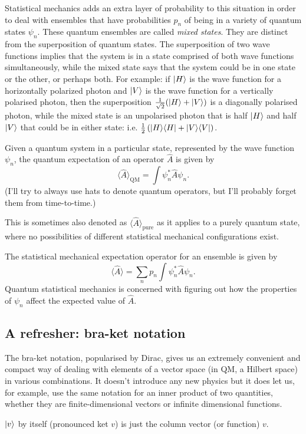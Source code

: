 \documentclass{article}
\begin{document}
Statistical mechanics adds an extra layer of probability to this situation in order to deal with ensembles that have probabilities $p_n$ of being in a variety of quantum states $\psi_n$. These quantum ensembles are called \emph{mixed states}. They are distinct from the superposition of quantum states. The superposition of two wave functions implies that the system is in a state comprised of both wave functions simultaneously, while the mixed state says that the system could be in one state or the other, or perhaps both. For example: if $| H \rangle$
is the wave function for a horizontally polarized photon and $| V \rangle$ is the wave function for a vertically polarised photon, then the superposition $\frac{1}{\sqrt{2}}(| H \rangle+| V \rangle)$ is a diagonally polarised photon, while the mixed state is an unpolarised photon that is half $| H \rangle$ and half $| V \rangle$ that could be in either state:  i.e. $\frac12\left(| H \rangle\langle H |+| V \rangle\langle V |\right)$.

Given a quantum system in a particular state, represented by the wave function $\psi_n$, the quantum expectation of an operator $\hat{A}$ is given by
$$
	\langle\hat{A}\rangle_\text{QM} = \int\psi^*_n\hat{A}\psi_n.
$$
(I'll try to always use hats to denote quantum operators, but I'll probably forget them from time-to-time.)

This is sometimes also denoted as $\langle\hat{A}\rangle_\text{pure}$ as it applies to a purely quantum state, where no possibilities of different statistical mechanical configurations exist.

The statistical mechanical expectation operator for an ensemble is given by
$$
		\langle\hat{A}\rangle = \sum_n p_n\int\psi_n^*\hat{A}\psi_n.
$$
Quantum statistical mechanics is concerned with figuring out how the properties of $\psi_n$ affect the expected value of $\hat{A}$.

\subsection*{A refresher: bra-ket notation}
The bra-ket notation, popularised by Dirac, gives us an extremely convenient and compact way of dealing with elements of a vector space (in QM, a Hilbert space) in various combinations. It doesn't introduce any new physics but it does let us, for example, use the same notation for an inner product of two quantities, whether they are finite-dimensional vectors or infinite dimensional functions.

$| v \rangle$ by itself (pronounced ket $v$) is just the column vector (or function) $v$.
\end{document}
